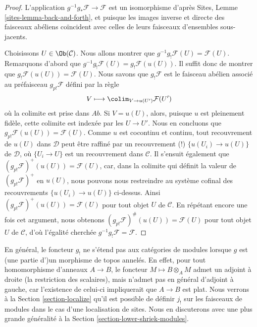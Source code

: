 \begin{proof}
L'application $g^{-1}g_*\mathcal{F} \to \mathcal{F}$ est un isomorphisme
d'après Sites, Lemme \ref{sites-lemma-back-and-forth}, et puisque les images
inverse et directe des faisceaux abéliens coïncident avec celles de leurs
faisceaux d'ensembles sous-jacents.

\medskip\noindent
Choisissons $U \in \Ob(\mathcal{C})$. Nous allons montrer que
$g^{-1}g_!\mathcal{F}(U) = \mathcal{F}(U)$. Remarquons d'abord que
$g^{-1}g_!\mathcal{F}(U) = g_!\mathcal{F}(u(U))$. Il suffit donc de montrer que
$g_!\mathcal{F}(u(U)) = \mathcal{F}(U)$. Nous savons que $g_!\mathcal{F}$ est
le faisceau abélien associé au préfaisceau $g_{p!}\mathcal{F}$ défini par la
règle
$$
V \longmapsto \colim_{V \to u(U')} \mathcal{F}(U')
$$
où la colimite est prise dans $\textit{Ab}$. Si $V = u(U)$, alors, puisque $u$
est pleinement fidèle, cette colimite est indexée par les $U \to U'$. Nous en
concluons que $g_{p!}\mathcal{F}(u(U)) = \mathcal{F}(U)$. Comme $u$ est
cocontinu et continu, tout recouvrement de $u(U)$ dans $\mathcal{D}$ peut être
raffiné par un recouvrement (!) $\{u(U_i) \to u(U)\}$ de $\mathcal{D}$, où
$\{U_i \to U\}$ est un recouvrement dans $\mathcal{C}$. Il s'ensuit également
que $(g_{p!}\mathcal{F})^+(u(U)) = \mathcal{F}(U)$, car, dans la colimite qui
définit la valeur de $(g_{p!}\mathcal{F})^+$ en $u(U)$, nous pouvons nous
restreindre au système cofinal des recouvrements
$\{u(U_i) \to u(U)\}$ ci-dessus. Ainsi
$(g_{p!}\mathcal{F})^+(u(U)) = \mathcal{F}(U)$ pour tout objet $U$ de
$\mathcal{C}$. En répétant encore une fois cet argument, nous obtenons
$(g_{p!}\mathcal{F})^\#(u(U)) = \mathcal{F}(U)$ pour tout objet $U$ de
$\mathcal{C}$, d'où l'égalité cherchée $g^{-1}g_!\mathcal{F} = \mathcal{F}$.
\end{proof}

\begin{remark}
\label{remark-no-extension}
En général, le foncteur $g_!$ ne s'étend pas aux catégories de modules lorsque
$g$ est (une partie d')un morphisme de topos annelés. En effet, pour tout
homomorphisme d'anneaux $A \to B$, le foncteur
$M \mapsto B \otimes_A M$ admet un adjoint à droite (la restriction des
scalaires), mais n'admet pas en général d'adjoint à gauche, car l'existence de
celui-ci impliquerait que $A \to B$ est plat. Nous verrons à la Section
\ref{section-localize} qu'il est possible de définir $j_!$ sur les faisceaux de
modules dans le cas d'une localisation de sites. Nous en discuterons avec une
plus grande généralité à la Section \ref{section-lower-shriek-modules}.
\end{remark}

